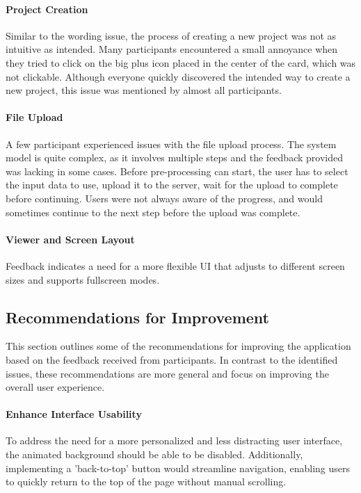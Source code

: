 \paragraph{Project Creation}
Similar to the wording issue, the process of creating a new project was not as intuitive as intended.
Many participants encountered a small annoyance when they tried to click on the big plus icon placed in the center of the card, which was not clickable. 
Although everyone quickly discovered the intended way to create a new project, this issue was mentioned by almost all participants.

\paragraph{File Upload}
\label{sec:results:issues:file_upload}
A few participant experienced issues with the file upload process.
The system model is quite complex, as it involves multiple steps and the feedback provided was lacking in some cases.
Before pre-processing can start, the user has to select the input data to use, upload it to the server, wait for the upload to complete before continuing.
Users were not always aware of the progress, and would sometimes continue to the next step before the upload was complete. 

\paragraph{Viewer and Screen Layout}
Feedback indicates a need for a more flexible UI that adjusts to different screen sizes and supports fullscreen modes.

\subsection*{Recommendations for Improvement}
\label{sec:results:recommendations}

This section outlines some of the recommendations for improving the application based on the feedback received from participants. 
In contrast to the identified issues, these recommendations are more general and focus on improving the overall user experience.

\paragraph{Enhance Interface Usability}
To address the need for a more personalized and less distracting user interface, the animated background should be able to be disabled.
Additionally, implementing a 'back-to-top' button would streamline navigation, enabling users to quickly return to the top of the page without manual scrolling.

